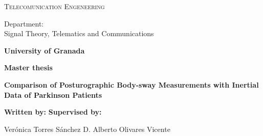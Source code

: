 \begin{titlepage}
\label{ch:cover}
\begin{center}

{\Large\textsc{Telecomunication Engeneering}}


Department:  \\ Signal Theory, Telematics and Communications

\textbf{University of Granada}


\vspace{0.5cm}

\begin{figure}[h]
	\centering
	\label{fig:ugr}
\end{figure}


\vspace{0.5cm}
\textbf{Master thesis}


\vspace{0.9cm}


{\Huge\textbf{Comparison of Posturographic Body-sway Measurements with Inertial Data of Parkinson Patients }}


\end{center}


\vspace{1.5cm}
\textbf{Written by:}  \hfill \textbf{Supervised by:}

Ver\'onica Torres S\'anchez \hfill D. Alberto Olivares Vicente



\end{titlepage}
